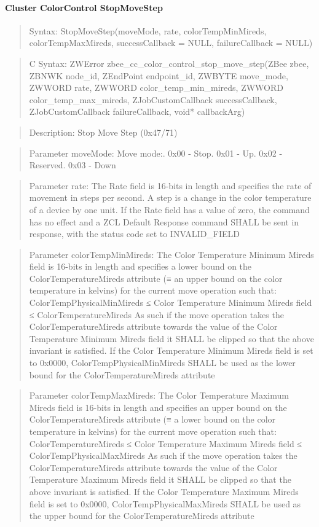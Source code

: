 \paragraph{Cluster ColorControl StopMoveStep}
\begin{quote}Syntax: StopMoveStep(moveMode, rate, colorTempMinMireds, colorTempMaxMireds, successCallback = NULL, failureCallback = NULL)\end{quote}
\begin{quote}C Syntax: ZWError zbee\_cc\_color\_control\_stop\_move\_step(ZBee zbee, ZBNWK node\_id, ZEndPoint endpoint\_id, ZWBYTE move\_mode, ZWWORD rate, ZWWORD color\_temp\_min\_mireds, ZWWORD color\_temp\_max\_mireds, ZJobCustomCallback successCallback, ZJobCustomCallback failureCallback, void* callbackArg)\end{quote}
\begin{quote}Description: Stop Move Step (0x47/71)\end{quote}
\begin{quote}Parameter moveMode: Move mode:. 0x00 - Stop. 0x01 - Up. 0x02 - Reserved. 0x03 - Down\end{quote}
\begin{quote}Parameter rate: The Rate field is 16-bits in length and specifies the rate of movement in steps per second. A step is a change in the color temperature of a device by one unit. If the Rate field has a value of zero, the command has no effect and a ZCL Default Response command SHALL be sent in response, with the status code set to INVALID\_FIELD\end{quote}
\begin{quote}Parameter colorTempMinMireds: The Color Temperature Minimum Mireds field is 16-bits in length and specifies a lower bound on the ColorTemperatureMireds attribute (≡ an upper bound on the color temperature in kelvins) for the current move operation such that: ColorTempPhysicalMinMireds ≤ Color Temperature Minimum Mireds field ≤ ColorTemperatureMireds As such if the move operation takes the ColorTemperatureMireds attribute towards the value of the Color Temperature Minimum Mireds field it SHALL be clipped so that the above invariant is satisfied. If the Color Temperature Minimum Mireds field is set to 0x0000, ColorTempPhysicalMinMireds SHALL be used as the lower bound for the ColorTemperatureMireds attribute\end{quote}
\begin{quote}Parameter colorTempMaxMireds: The Color Temperature Maximum Mireds field is 16-bits in length and specifies an upper bound on the ColorTemperatureMireds attribute (≡ a lower bound on the color temperature in kelvins) for the current move operation such that: ColorTemperatureMireds ≤ Color Temperature Maximum Mireds field ≤ ColorTempPhysicalMaxMireds As such if the move operation takes the ColorTemperatureMireds attribute towards the value of the Color Temperature Maximum Mireds field it SHALL be clipped so that the above invariant is satisfied. If the Color Temperature Maximum Mireds field is set to 0x0000, ColorTempPhysicalMaxMireds SHALL be used as the upper bound for the ColorTemperatureMireds attribute\end{quote}
